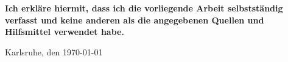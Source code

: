 

\thispagestyle{empty}

\textbf{Ich erkläre hiermit, dass ich die vorliegende Arbeit selbstständig verfasst und keine
anderen als die angegebenen Quellen und Hilfsmittel verwendet habe.}

\vspace{2cm}

 \hspace{5cm} Karlsruhe, den \today

\setcounter{page}{0}
\tableofcontents
\listoffigures
\lstlistoflistings
